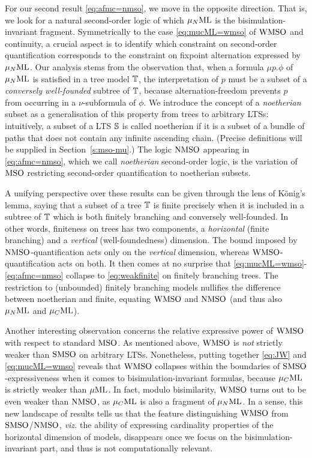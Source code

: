 For our second result \eqref{eq:afmc=nmso}, we move in the opposite direction.
That is, we look for a natural second-order logic of which $\mu_{N}\mathrm{ML}$ is the 
bisimulation-invariant fragment. 
Symmetrically to the case \eqref{eq:mucML=wmso} of $\mathrm{WMSO}$ and continuity, a 
crucial aspect is to identify which constraint on second-order quantification
corresponds to the constraint on fixpoint alternation expressed by $\mu_{N}\mathrm{ML}$. 
Our analysis stems from the observation that, when a formula $\mu p.\phi$ of
$\mu_{N}\mathrm{ML}$ is satisfied in a tree model $\mathbb{T}$, the interpretation of $p$ must be
a subset of a \emph{conversely well-founded} subtree of $\mathbb{T}$, because 
alternation-freedom prevents $p$ from occurring in a $\nu$-subformula of $\phi$. 
We introduce the concept of a \emph{noetherian} subset as a generalisation of 
this property from trees to arbitrary LTSs: intuitively, a subset of a LTS 
$\mathbb{S}$ is called noetherian if it is a subset of a bundle of paths that does
not contain any infinite ascending chain. 
(Precise definitions will be supplied in Section~\ref{s:mso-mu}.)
The logic $\mathrm{NMSO}$ appearing in \eqref{eq:afmc=nmso}, which we call 
\emph{noetherian} second-order logic, is the variation of $\mathrm{MSO}$ restricting 
second-order quantification to noetherian subsets.

A unifying perspective over these results can be given through the lens of
K\"onig's lemma, saying that a subset of a tree $\mathbb{T}$ is finite precisely 
when it is included in a subtree of $\mathbb{T}$ which is both finitely branching 
and conversely well-founded.
In other words, finiteness on trees has two components, a \emph{horizontal}
(finite branching) and a \emph{vertical} (well-foundedness) dimension. 
The bound imposed by $\mathrm{NMSO}$-quantification acts only on the \emph{vertical}
dimension, whereas $\mathrm{WMSO}$-quantification acts on both. 
It then comes at no surprise that \eqref{eq:mucML=wmso}-\eqref{eq:afmc=nmso}
collapse to \eqref{eq:weakfinite} on finitely branching trees.
The restriction to (unbounded) finitely branching models nullifies the 
difference between noetherian and finite, equating $\mathrm{WMSO}$ and $\mathrm{NMSO}$ (and 
thus also $\mu_{N}\mathrm{ML}$ and $\mu_{C}\mathrm{ML}$).

Another interesting observation concerns the relative expressive power of 
$\mathrm{WMSO}$ with respect to standard $\mathrm{MSO}$. 
As mentioned above, $\mathrm{WMSO}$ is \emph{not} strictly weaker than $\mathrm{SMSO}$ on 
arbitrary LTSs. 
Nonetheless, putting together \eqref{eq:JW} and \eqref{eq:mucML=wmso} reveals 
that $\mathrm{WMSO}$ collapses within the boundaries of $\mathrm{SMSO}$-expressiveness when it 
comes to bisimulation-invariant formulas, because $\mu_{C}\mathrm{ML}$ is strictly weaker
than $\mu\mathrm{ML}$. 
In fact, modulo bisimilarity, $\mathrm{WMSO}$ turns out to be even weaker than $\mathrm{NMSO}$, 
as $\mu_{C}\mathrm{ML}$ is also a fragment of $\mu_{N}\mathrm{ML}$. 
In a sense, this new landscape of results tells us that the feature 
distinguishing $\mathrm{WMSO}$ from $\mathrm{SMSO}$/$\mathrm{NMSO}$, \emph{viz.} the ability of 
expressing cardinality properties of the horizontal dimension of models, 
disappears once we focus on the bisimulation-invariant part, and thus is not
computationally relevant.

